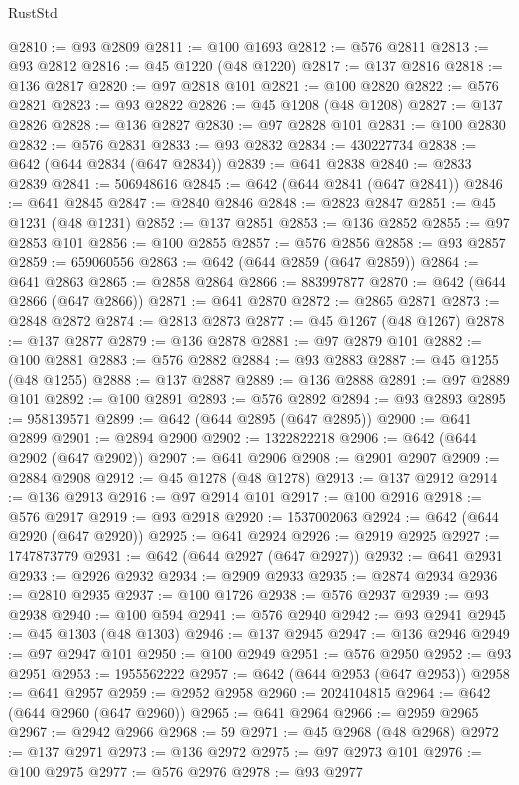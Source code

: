 \begin{lexlean}{RustStd}
\begin{coremodule}
@2810 := @93 @2809
@2811 := @100 @1693
@2812 := @576 @2811
@2813 := @93 @2812
@2816 := @45 @1220 (@48 @1220)
@2817 := @137 @2816
@2818 := @136 @2817
@2820 := @97 @2818 @101
@2821 := @100 @2820
@2822 := @576 @2821
@2823 := @93 @2822
@2826 := @45 @1208 (@48 @1208)
@2827 := @137 @2826
@2828 := @136 @2827
@2830 := @97 @2828 @101
@2831 := @100 @2830
@2832 := @576 @2831
@2833 := @93 @2832
@2834 := 430227734
@2838 := @642 (@644 @2834 (@647 @2834))
@2839 := @641 @2838
@2840 := @2833 @2839
@2841 := 506948616
@2845 := @642 (@644 @2841 (@647 @2841))
@2846 := @641 @2845
@2847 := @2840 @2846
@2848 := @2823 @2847
@2851 := @45 @1231 (@48 @1231)
@2852 := @137 @2851
@2853 := @136 @2852
@2855 := @97 @2853 @101
@2856 := @100 @2855
@2857 := @576 @2856
@2858 := @93 @2857
@2859 := 659060556
@2863 := @642 (@644 @2859 (@647 @2859))
@2864 := @641 @2863
@2865 := @2858 @2864
@2866 := 883997877
@2870 := @642 (@644 @2866 (@647 @2866))
@2871 := @641 @2870
@2872 := @2865 @2871
@2873 := @2848 @2872
@2874 := @2813 @2873
@2877 := @45 @1267 (@48 @1267)
@2878 := @137 @2877
@2879 := @136 @2878
@2881 := @97 @2879 @101
@2882 := @100 @2881
@2883 := @576 @2882
@2884 := @93 @2883
@2887 := @45 @1255 (@48 @1255)
@2888 := @137 @2887
@2889 := @136 @2888
@2891 := @97 @2889 @101
@2892 := @100 @2891
@2893 := @576 @2892
@2894 := @93 @2893
@2895 := 958139571
@2899 := @642 (@644 @2895 (@647 @2895))
@2900 := @641 @2899
@2901 := @2894 @2900
@2902 := 1322822218
@2906 := @642 (@644 @2902 (@647 @2902))
@2907 := @641 @2906
@2908 := @2901 @2907
@2909 := @2884 @2908
@2912 := @45 @1278 (@48 @1278)
@2913 := @137 @2912
@2914 := @136 @2913
@2916 := @97 @2914 @101
@2917 := @100 @2916
@2918 := @576 @2917
@2919 := @93 @2918
@2920 := 1537002063
@2924 := @642 (@644 @2920 (@647 @2920))
@2925 := @641 @2924
@2926 := @2919 @2925
@2927 := 1747873779
@2931 := @642 (@644 @2927 (@647 @2927))
@2932 := @641 @2931
@2933 := @2926 @2932
@2934 := @2909 @2933
@2935 := @2874 @2934
@2936 := @2810 @2935
@2937 := @100 @1726
@2938 := @576 @2937
@2939 := @93 @2938
@2940 := @100 @594
@2941 := @576 @2940
@2942 := @93 @2941
@2945 := @45 @1303 (@48 @1303)
@2946 := @137 @2945
@2947 := @136 @2946
@2949 := @97 @2947 @101
@2950 := @100 @2949
@2951 := @576 @2950
@2952 := @93 @2951
@2953 := 1955562222
@2957 := @642 (@644 @2953 (@647 @2953))
@2958 := @641 @2957
@2959 := @2952 @2958
@2960 := 2024104815
@2964 := @642 (@644 @2960 (@647 @2960))
@2965 := @641 @2964
@2966 := @2959 @2965
@2967 := @2942 @2966
@2968 := 59
@2971 := @45 @2968 (@48 @2968)
@2972 := @137 @2971
@2973 := @136 @2972
@2975 := @97 @2973 @101
@2976 := @100 @2975
@2977 := @576 @2976
@2978 := @93 @2977

\end{coremodule}
\end{lexlean}
